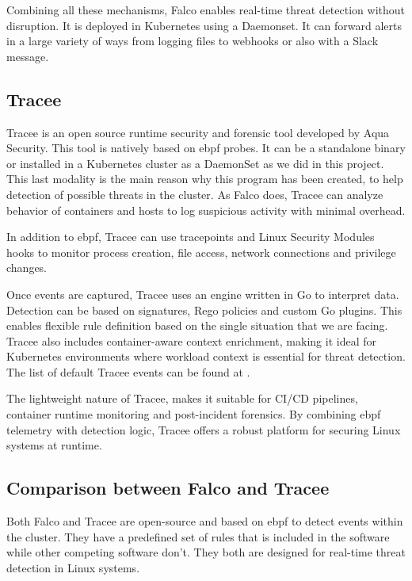 Combining all these mechanisms, Falco enables real-time threat detection without disruption. It is deployed in Kubernetes using a Daemonset. It can forward alerts in a large variety of ways from logging files to webhooks or also with a Slack message.


\subsection{Tracee}
Tracee is an open source runtime security and forensic tool developed by Aqua Security. This tool is natively based on \ac{ebpf} probes. It can be a standalone binary or installed in a Kubernetes cluster as a DaemonSet as we did in this project. This last modality is the main reason why this program has been created, to help detection of possible threats in the cluster. As Falco does, Tracee can analyze behavior of containers and hosts to log suspicious activity with minimal overhead.

In addition to \ac{ebpf}, Tracee can use tracepoints and Linux Security Modules hooks to monitor process creation, file access, network connections and privilege changes.

Once events are captured, Tracee uses an engine written in Go to interpret data. Detection can be based on signatures, Rego policies and custom Go plugins. This enables flexible rule definition based on the single situation that we are facing. Tracee also includes container-aware context enrichment, making it ideal for Kubernetes environments where workload context is essential for threat detection. The list of default Tracee events can be found at \cite{traceeRules}.

The lightweight nature of Tracee, makes it suitable for CI/CD pipelines, container runtime monitoring and post-incident forensics. By combining \ac{ebpf} telemetry with detection logic, Tracee offers a robust platform for securing Linux systems at runtime.


\subsection{Comparison between Falco and Tracee}
Both Falco and Tracee are open-source and based on \ac{ebpf} to detect events within the cluster. They have a predefined set of rules that is included in the software while other competing software don't. They both are designed for real-time threat detection in Linux systems.

